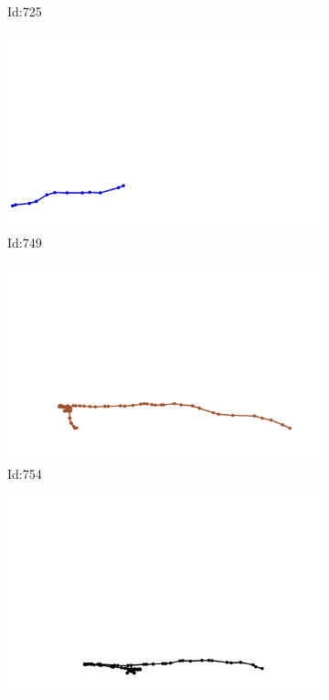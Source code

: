 \documentclass[12pt,twoside]{report}
\begin{document}
\begin{figure}
\begin{subfigure}[b]{0.20\textwidth}
\caption{Id:725}
\end{subfigure}
\begin{subfigure}[b]{0.20\textwidth}
\centering
\includegraphics[width=\textwidth]{../trajectories/749.png}
\caption{Id:749}
\end{subfigure}
\begin{subfigure}[b]{0.20\textwidth}
\centering
\includegraphics[width=\textwidth]{../trajectories/754.png}
\caption{Id:754}
\end{subfigure}
\begin{subfigure}[b]{0.20\textwidth}
\centering
\includegraphics[width=\textwidth]{../trajectories/829.png}

\end{subfigure}
\end{figure}
\end{document}
